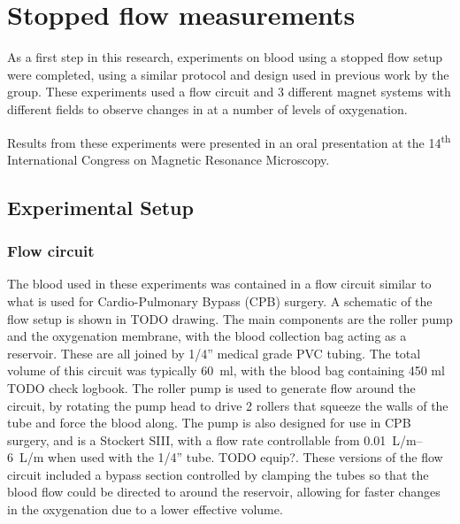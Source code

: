 \chapter{Stopped flow \SOtwo measurements}\label{ch:stoppedflow}

As a first step in this research, experiments on blood using a stopped flow setup were completed, using a similar protocol and design used in previous work by the group.
These experiments used a flow circuit and 3 different magnet systems with different fields to observe changes in \Ttwo at a number of levels of oxygenation.

Results from these experiments were presented in an oral presentation at the 14\textsuperscript{th} International Congress on Magnetic Resonance Microscopy.

\section{Experimental Setup}

\subsection{Flow circuit}
The blood used in these experiments was contained in a flow circuit similar to what is used for Cardio-Pulmonary Bypass (CPB) surgery.
A schematic of the flow setup is shown in TODO drawing.
The main components are the roller pump and the oxygenation membrane, with the blood collection bag acting as a reservoir.
These are all joined by 1/4'' medical grade PVC tubing.
The total volume of this circuit was typically \SI{60}{\milli\litre}, with the blood bag containing 450 ml TODO check logbook.
The roller pump is used to generate flow around the circuit, by rotating the pump head to drive 2 rollers that squeeze the walls of the tube and force the blood along.
The pump is also designed for use in CPB surgery, and is a Stockert SIII, with a flow rate controllable from \SIrange{0.01}{6}{L/m} when used with the 1/4'' tube. TODO equip?.
These versions of the flow circuit included a bypass section controlled by clamping the tubes so that the blood flow could be directed to around the reservoir, allowing for faster changes in the oxygenation due to a lower effective volume.


